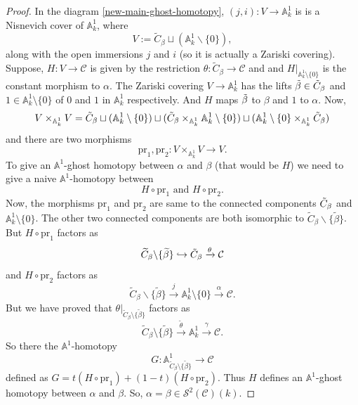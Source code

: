 \documentclass[11pt, reqno]{amsart}
\theoremstyle{plain}
\theoremstyle{definition}
\renewcommand{\tilde}{\widetilde}
\newcommand{\sC}{{\mathcal C}}
\newcommand{\sS}{{\mathcal S}}
\newcommand{\A}{{\mathbb A}}
\begin{document}
\begin{proof}
In the diagram \ref{new-main-ghost-homotopy}, $(j,i): V \to \A^1_k$ is 
is a Nisnevich cover of $\A^1_k$, where
$$V:=\tilde{C}_{\beta} \sqcup (\A^1_k \backslash \{0\}),  $$
along with the open immersions $j$ and $i$ (so it is actually a Zariski covering).
Suppose, $H : V \to \mathcal{C}$ is given by the restriction $\theta: \tilde{C}_\beta \to \sC$ and
and $H|_{\mathbb{A}^1_k \setminus \{0\}}$ is the constant morphism to $\alpha$. The Zariski covering $V \to \mathbb{A}^1_k$ has the lifts $\Tilde{\beta} \in \Tilde{C}_\beta$ and $1 \in \mathbb{A}^1_k \setminus \{0\}$ of $0$ and $1$ in $\mathbb{A}^1_k$ respectively. And $H$ maps $\Tilde{\beta}$ to $\beta$ and $1$ to $\alpha$.
Now,
$$V \times_{\mathbb{A}^1_k} V = \Tilde{C}_\beta \sqcup (\mathbb{A}^1_k \setminus\{0\}) \sqcup (\Tilde{C}_\beta \times_{\mathbb{A}^1_k} \mathbb{A}^1_k \setminus\{0\}) \sqcup (\mathbb{A}^1_k \setminus\{0\} \times_{\mathbb{A}^1_k} \Tilde{C}_\beta)$$
and there are two morphisms
$$\text{pr}_1, \text{pr}_2: V \times_{\mathbb{A}^1_k} V \to V.$$
To give an $\mathbb{A}^1$-ghost homotopy between $\alpha$ and $\beta$ (that would be $H$) we need to give a naive $\mathbb{A}^1$-homotopy between 
$$H \circ \text{pr}_1 \text{ and } H \circ \text{pr}_2.$$
Now, the morphisms $\text{pr}_1$ and $\text{pr}_2$ are same to the connected components $\Tilde{C}_\beta$ and $\mathbb{A}^1_k \setminus\{0\}$. The other two connected components are both isomorphic to $\tilde{C}_{\beta}\backslash\{\tilde{\beta}\}$. But $H \circ \text{pr}_1$ factors as
$$\tilde{C}_{\beta}\backslash\{\tilde{\beta}\} \hookrightarrow \Tilde{C}_\beta \xrightarrow{\theta} \mathcal{C}$$
and $H \circ \text{pr}_2$ factors as
$$\tilde{C}_{\beta}\backslash\{\tilde{\beta}\} \xrightarrow{j} \mathbb{A}^1_k \setminus \{0\} \xrightarrow{\alpha} \mathcal{C}.$$
But we have proved that $\theta|_{\tilde{C}_\beta \setminus \{\tilde{\beta}\}}$ factors as
$$\tilde{C}_\beta \setminus \{\tilde{\beta}\} \xrightarrow{\tilde{\theta}} \A^1_k \xrightarrow{\gamma} \sC.$$
So there the $\mathbb{A}^1$-homotopy
$$G:\A^1_{\tilde{C}_\beta \setminus \{\tilde{\beta}\}} \to \sC$$
defined as $G = t (H \circ \text{pr}_1) + (1-t) (H \circ \text{pr}_2)$. Thus $H$ defines an $\A^1$-ghost homotopy between $\alpha$ and $\beta$. So, $\alpha = \beta \in \sS^2(\sC)(k)$.



\end{proof}
\end{document}
